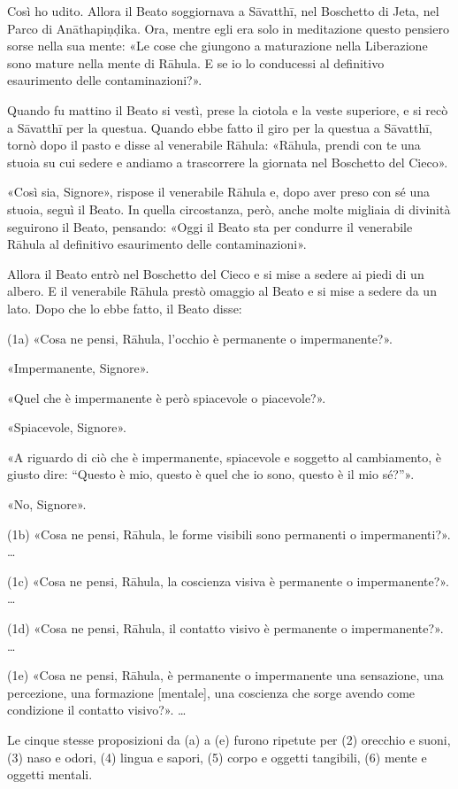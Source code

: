  Così ho udito. Allora il Beato soggiornava a Sāvatthī, nel
Boschetto di Jeta, nel Parco di Anāthapiṇḍika. Ora, mentre egli era solo in
meditazione questo pensiero sorse nella sua mente: «Le cose che giungono a
maturazione nella Liberazione sono mature nella mente di Rāhula. E se io lo
conducessi al definitivo esaurimento delle contaminazioni?».

Quando fu mattino il Beato si vestì, prese la ciotola e la veste superiore, e si
recò a Sāvatthī per la questua. Quando ebbe fatto il giro per la questua a
Sāvatthī, tornò dopo il pasto e disse al venerabile Rāhula: «Rāhula, prendi con
te una stuoia su cui sedere e andiamo a trascorrere la giornata nel Boschetto
del Cieco».

«Così sia, Signore», rispose il venerabile Rāhula e, dopo aver preso con sé una
stuoia, seguì il Beato. In quella circostanza, però, anche molte migliaia di
divinità seguirono il Beato, pensando: «Oggi il Beato sta per condurre il
venerabile Rāhula al definitivo esaurimento delle contaminazioni».

Allora il Beato entrò nel Boschetto del Cieco e si mise a sedere ai piedi di un
albero. E il venerabile Rāhula prestò omaggio al Beato e si mise a sedere da un
lato. Dopo che lo ebbe fatto, il Beato disse:

(1a) «Cosa ne pensi, Rāhula, l’occhio è permanente o impermanente?».

«Impermanente, Signore».

«Quel che è impermanente è però spiacevole o piacevole?».

«Spiacevole, Signore».

«A riguardo di ciò che è impermanente, spiacevole e soggetto al cambiamento, è
giusto dire: “Questo è mio, questo è quel che io sono, questo è il mio sé?”».

«No, Signore».

(1b) «Cosa ne pensi, Rāhula, le forme visibili sono permanenti o
impermanenti?». …

(1c) «Cosa ne pensi, Rāhula, la coscienza visiva è permanente o
impermanente?». …

(1d) «Cosa ne pensi, Rāhula, il contatto visivo è permanente o
impermanente?». …

(1e) «Cosa ne pensi, Rāhula, è permanente o impermanente una sensazione,
una percezione, una formazione [mentale], una coscienza che sorge avendo
come condizione il contatto visivo?». …

 Le cinque stesse proposizioni da (a) a (e) furono
ripetute per (2) orecchio e suoni, (3) naso e odori, (4) lingua e sapori, (5)
corpo e oggetti tangibili, (6) mente e oggetti mentali.

